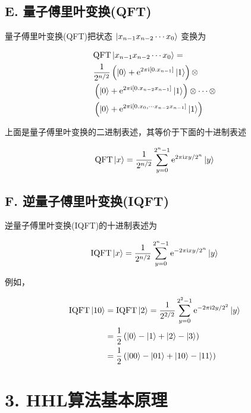 \documentclass[aps,prl,twocolumn,groupedaddress]{revtex4-2}
\begin{document}
\subsection{E. 量子傅里叶变换(QFT)}

量子傅里叶变换(QFT)把状态 $\ket{x_{n-1}x_{n-2}\cdots x_0} $ 变换为

$$
\begin{aligned}
&\mathrm{QFT}\ket{x_{n-1}x_{n-2}\cdots x_0}= \\
&\frac{1 }{2^{n/2} } \left(\ket{0} + \mathrm{e}^{2\pi\mathrm{i}\left[0.x_{n-1} \right]}\ket{1} \right) \otimes \\
&\left(\ket{0} + \mathrm{e}^{2\pi\mathrm{i}\left[0.x_{n-2}x_{n-1} \right]}\ket{1} \right) \otimes\cdots \otimes \\
&\left(\ket{0}+\mathrm{e}^{2\pi\mathrm{i}\left[0.x_0,\cdots x_{n-2}x_{n-1}\right]}\ket{1} \right)
\end{aligned}
$$

上面是量子傅里叶变换的二进制表述，其等价于下面的十进制表述

$$
\begin{aligned}
\mathrm{QFT}\ket{x}
=\frac{1 }{2^{n/2} } \sum_{y=0}^{2^n-1} \mathrm{e}^{2\pi\mathrm{i} x y / 2^n}\ket{y}
\end{aligned}
$$

\subsection{F. 逆量子傅里叶变换(IQFT)}

逆量子傅里叶变换(IQFT)的十进制表述为

$$
\mathrm{IQFT}\ket{x}
=\frac{1 }{2^{n/2} } \sum_{y=0}^{2^n-1} \mathrm{e}^{-2\pi\mathrm{i} x y / 2^n}\ket{y}
$$

例如，

$$
\begin{aligned}
\mathrm{IQFT}\ket{10}
&=\mathrm{IQFT}\ket{2}
=\frac{1 }{2^{2/2} } \sum_{y=0}^{2^2-1} \mathrm{e}^{-2\pi\mathrm{i}2y/2^2}\ket{y} \\
&=\frac{1 }{2 } \left(\ket{0}-\ket{1}+\ket{2}-\ket{3} \right) \\
&=\frac{1 }{2 } \left(\ket{00}-\ket{01}+\ket{10}-\ket{11} \right)
\end{aligned}
$$

\section{3. HHL算法基本原理}
\end{document}

